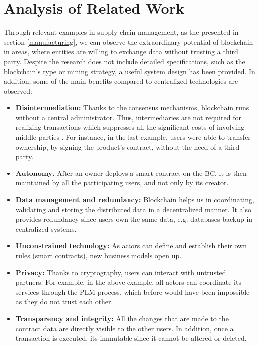 \section{Analysis of Related Work} \label{analysisOfRelatedWork}

Through relevant examples in supply chain management, as the presented in section \ref{manufacturing}, we can observe the extraordinary potential of blockchain in areas, where entities are willing to exchange data without trusting a third party. Despite the research does not include detailed specifications, such as the blockchain's type or mining strategy, a useful system design has been provided. In addition, some of the main benefits compared to centralized technologies are observed:

\begin{itemize}
	\item \textbf{Disintermediation:} Thanks to the consensus mechanisms, blockchain runs without a central administrator. Thus, intermediaries are not required for realizing transactions which suppresses all the significant costs of involving middle-parties \citep{mainelli2015sharing}. For instance, in the last example, users were able to transfer ownership, by signing the product's contract, without the need of a third party.
	\item \textbf{Autonomy:} After an owner deploys a smart contract on the BC, it is then maintained by all the participating users, and not only by its creator.
	\item \textbf{Data management and redundancy:} Blockchain helps us in coordinating, validating and storing the distributed data in a decentralized manner. It also provides redundancy since users own the same data, e.g. databases backup in centralized systems. 
	\item \textbf{Unconstrained technology:} As actors can define and establish their own rules (smart contracts), new business models open up.
	\item \textbf{Privacy:} Thanks to cryptography, users can interact with untrusted partners. For example, in the above example, all actors can coordinate its services through the PLM process, which before would have been impossible as they do not trust each other.
    \item \textbf{Transparency and integrity:} All the changes that are made to the contract data are directly visible to the other users. In addition, once a transaction is executed, its immutable since it cannot be altered or deleted.
	
\end{itemize}

